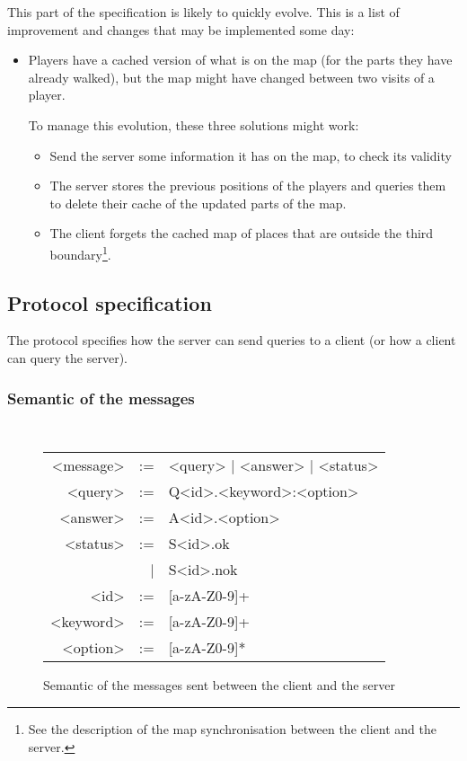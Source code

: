 \documentclass{article}
\begin{document}
This part of the specification is likely to quickly evolve. This is a list of
improvement and changes that may be implemented some day:
\begin{itemize}
	\item Players have a cached version of what is on the map (for the parts
	they have already walked), but the map might have changed between two visits
	of a player.

	To manage this evolution, these three solutions might work:
	\begin{itemize}
	\item Send the server some information it has on the map, to check its
	validity
	\item The server stores the previous positions of the players and queries
	them to delete their cache of the updated parts of the map.
	\item The client forgets the cached map of places that are outside the
	third boundary\footnote{See the description of the map synchronisation
	between the client and the server.}.
	\end{itemize}
\end{itemize}

\subsection{Protocol specification}
The protocol specifies how the server can send queries to a client (or how a
client can query the server).

\subsubsection{Semantic of the messages}
\begin{figure}[H]
	\centering
	{\tt
	\begin{tabular}{rrl}
		<message> & := & <query> | <answer> | <status>\\
		<query> & := & Q<id>.<keyword>:<option>\\
		<answer> & := &A<id>.<option>\\
		<status> & := &S<id>.ok\\
			&|& S<id>.nok\\
		<id> &:= & [a-zA-Z0-9]+\\
		<keyword> &:= & [a-zA-Z0-9]+\\
		<option> &:= & [a-zA-Z0-9]*\\
	\end{tabular}
	}
	\caption{Semantic of the messages sent between the client and the server}
\end{figure}
\end{document}
